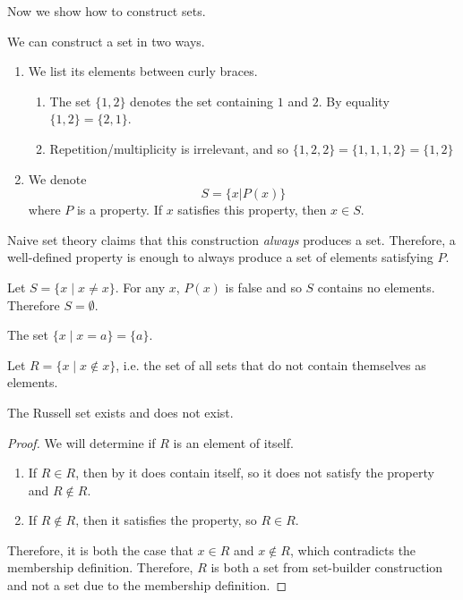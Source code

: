 \documentclass{article}
\begin{document}
  Now we show how to construct sets. 

  \begin{definition}
    We can construct a set in two ways. 
    \begin{enumerate}
      \item We list its elements between curly braces. 
      \begin{enumerate}
        \item The set $\{1, 2\}$ denotes the set containing $1$ and $2$. By equality $\{1, 2\} = \{2, 1\}$. 
        \item Repetition/multiplicity is irrelevant, and so $\{1, 2, 2\} = \{1, 1, 1, 2\} = \{1, 2\}$ 
      \end{enumerate} 

      \item We denote 
      \begin{equation}
        S = \{ x | P(x) \}
      \end{equation} 
      where $P$ is a property. If $x$ satisfies this property, then $x \in S$. 
    \end{enumerate}
    Naive set theory claims that this construction \textit{always} produces a set. Therefore, a well-defined property is enough to always produce a set of elements satisfying $P$. 
  \end{definition} 

  \begin{example}
    Let $S = \{x \mid x \neq x \}$. For any $x$, $P(x)$ is false and so $S$ contains no elements. Therefore $S = \emptyset$. 
  \end{example}

  \begin{example}
    The set $\{x \mid x = a \} = \{a\}$. 
  \end{example}

  \begin{example}
    Let $R = \{x \mid x \not\in x\}$, i.e. the set of all sets that do not contain themselves as elements. 
  \end{example}

  \begin{theorem} 
    The Russell set exists and does not exist. 
  \end{theorem}
  \begin{proof}
    We will determine if $R$ is an element of itself. 
    \begin{enumerate}
      \item If $R \in R$, then by it does contain itself, so it does not satisfy the property and $R \not\in R$. 
      \item If $R \not\in R$, then it satisfies the property, so $R \in R$. 
    \end{enumerate}
    Therefore, it is both the case that $x \in R$ and $x \not\in R$, which contradicts the membership definition. Therefore, $R$ is both a set from set-builder construction and not a set due to the membership definition. 
  \end{proof}
\end{document}
